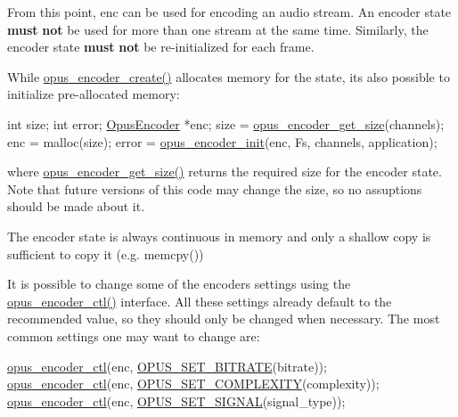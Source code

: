 From this point, {\ttfamily enc} can be used for encoding an audio stream. An encoder state {\bfseries must} {\bfseries not} be used for more than one stream at the same time. Similarly, the encoder state {\bfseries must} {\bfseries not} be re-\/initialized for each frame.

While \hyperlink{group__opus__encoder_gaa89264fd93c9da70362a0c9b96b9ca88}{opus\+\_\+encoder\+\_\+create()} allocates memory for the state, it\textquotesingle{}s also possible to initialize pre-\/allocated memory\+:


\begin{DoxyCode}
\textcolor{keywordtype}{int}          size;
\textcolor{keywordtype}{int}          error;
\hyperlink{group__opus__encoder_gaf461a3ef2f10c2fe8b994a176f06c9bd}{OpusEncoder} *enc;
size = \hyperlink{group__opus__encoder_gaefeb7dc1d6e3b59dea5ea674c86e9c18}{opus\_encoder\_get\_size}(channels);
enc = malloc(size);
error = \hyperlink{group__opus__encoder_ga515db1c267a7421dacaad3610f79eb79}{opus\_encoder\_init}(enc, Fs, channels, application);
\end{DoxyCode}


where \hyperlink{group__opus__encoder_gaefeb7dc1d6e3b59dea5ea674c86e9c18}{opus\+\_\+encoder\+\_\+get\+\_\+size()} returns the required size for the encoder state. Note that future versions of this code may change the size, so no assuptions should be made about it.

The encoder state is always continuous in memory and only a shallow copy is sufficient to copy it (e.\+g. memcpy())

It is possible to change some of the encoder\textquotesingle{}s settings using the \hyperlink{group__opus__encoder_ga164cbb0425238961919adf1db67949df}{opus\+\_\+encoder\+\_\+ctl()} interface. All these settings already default to the recommended value, so they should only be changed when necessary. The most common settings one may want to change are\+:


\begin{DoxyCode}
\hyperlink{group__opus__encoder_ga164cbb0425238961919adf1db67949df}{opus\_encoder\_ctl}(enc, \hyperlink{group__opus__encoderctls_ga0bb51947e355b33d0cb358463b5101a7}{OPUS\_SET\_BITRATE}(bitrate));
\hyperlink{group__opus__encoder_ga164cbb0425238961919adf1db67949df}{opus\_encoder\_ctl}(enc, \hyperlink{group__opus__encoderctls_ga3483877bf1687a75dd4a1de6f85f291c}{OPUS\_SET\_COMPLEXITY}(complexity));
\hyperlink{group__opus__encoder_ga164cbb0425238961919adf1db67949df}{opus\_encoder\_ctl}(enc, \hyperlink{group__opus__encoderctls_gaaa87ccee4ae46aa6c9528e03c5122b89}{OPUS\_SET\_SIGNAL}(signal\_type));
\end{DoxyCode}


